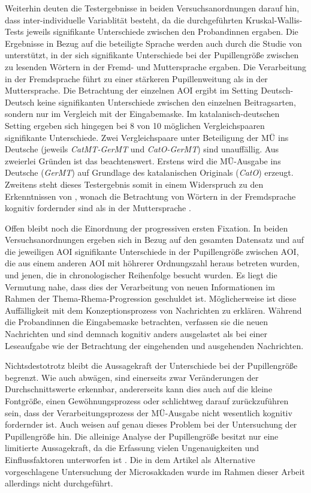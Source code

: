 Weiterhin deuten die Testergebnisse in beiden Versuchsanordnungen darauf hin, dass inter-individuelle Variablität besteht, da die durchgeführten Kruskal-Wallis-Tests jeweils signifikante Unterschiede zwischen den Proband{\textperiodcentered}innen ergaben. Die Ergebnisse in Bezug auf die beteiligte Sprache werden auch durch die Studie von \citet[608\psq]{hyona_pupil_1995} unterstützt, in der sich signifikante Unterschiede bei der Pupillengröße zwischen zu lesenden Wörtern in der Fremd- und Muttersprache ergaben. Die Verarbeitung in der Fremdsprache führt zu einer stärkeren Pupillenweitung als in der Muttersprache. Die Betrachtung der einzelnen AOI ergibt im Setting Deutsch-Deutsch keine signifikanten Unterschiede zwischen den einzelnen Beitragsarten, sondern nur im Vergleich mit der Eingabemaske. Im katalanisch-deutschen Setting ergeben sich hingegen bei 8 von 10 möglichen Vergleichspaaren signifikante Unterschiede. Zwei Vergleichspaare unter Beteiligung der MÜ ins Deutsche (jeweils \emph{CatMT-GerMT} und \emph{CatO-GerMT}) sind unauffällig. Aus zweierlei Gründen ist das beachtenswert. Erstens wird die MÜ-Ausgabe ins Deutsche (\emph{GerMT}) auf Grundlage des katalanischen Originals (\emph{CatO}) erzeugt. Zweitens steht dieses Testergebnis somit in einem Widerspruch zu den Erkenntnissen von \citeauthor{hyona_pupil_1995}, wonach die Betrachtung von Wörtern in der Fremdsprache kognitiv fordernder sind als in der Muttersprache \citep[610]{hyona_pupil_1995}.

Offen bleibt noch die Einordnung der progressiven ersten Fixation. In beiden Versuchsanordnungen ergeben sich in Bezug auf den gesamten Datensatz und auf die jeweiligen AOI signifikante Unterschiede in der Pupillengröße zwischen AOI, die aus einem anderen AOI mit höhrerer Ordnungszahl heraus betreten wurden, und jenen, die in chronologischer Reihenfolge besucht wurden. Es liegt die Vermutung nahe, dass dies der Verarbeitung von neuen Informationen im Rahmen der Thema-Rhema-Progression geschuldet ist. Möglicherweise ist diese Auffälligkeit mit dem Konzeptionsprozess von Nachrichten zu erklären. Während die Proband{\textperiodcentered}innen die Eingabemaske betrachten, verfassen sie die neuen Nachrichten und sind demnach kognitiv anders ausgelastet als bei einer Leseaufgabe wie der Betrachtung der eingehenden und ausgehenden Nachrichten.

Nichtsdestotrotz bleibt die Aussagekraft der Unterschiede bei der Pupillengröße begrenzt. Wie auch \citet[10]{doherty_eye_2010} abwägen, sind einerseits zwar Veränderungen der Durchschnittswerte erkennbar, andererseits kann dies auch auf die kleine Fontgröße, einen Gewöhnungsprozess oder schlichtweg darauf zurückzuführen sein, dass der Verarbeitungsprozess der MÜ-Ausgabe nicht wesentlich kognitiv fordernder ist. Auch \citeauthor{krejtz_eye_2018} weisen auf genau dieses Problem bei der Untersuchung der Pupillengröße hin. Die alleinige Analyse der Pupillengröße besitzt nur eine limitierte Aussagekraft, da die Erfassung vielen Ungenauigkeiten und Einflussfaktoren unterworfen ist \citep[19]{krejtz_eye_2018}. Die in dem Artikel als Alternative vorgeschlagene Untersuchung der Microsakkaden wurde im Rahmen dieser Arbeit allerdings nicht durchgeführt.


